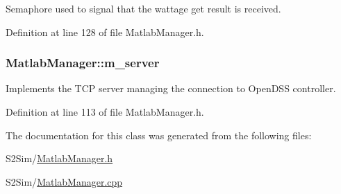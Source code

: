 Semaphore used to signal that the wattage get result is received. 



Definition at line 128 of file Matlab\-Manager.\-h.

\hypertarget{class_matlab_manager_a2eea12132471953cf6cdb6effb7233f9}{
\subsubsection[{m\-\_\-server}]{ Matlab\-Manager\-::m\-\_\-server\hspace{0.3cm}{\ttfamily [private]}}}\label{class_matlab_manager_a2eea12132471953cf6cdb6effb7233f9}


Implements the T\-C\-P server managing the connection to Open\-D\-S\-S controller. 



Definition at line 113 of file Matlab\-Manager.\-h.



The documentation for this class was generated from the following files\-:\begin{DoxyCompactItemize}
\item 
S2\-Sim/\hyperlink{_matlab_manager_8h}{Matlab\-Manager.\-h}\item 
S2\-Sim/\hyperlink{_matlab_manager_8cpp}{Matlab\-Manager.\-cpp}\end{DoxyCompactItemize}
